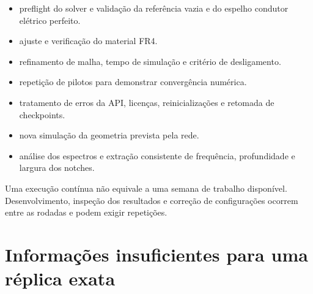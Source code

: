 \documentclass[11pt,a4paper]{article}
\begin{document}
\begin{itemize}
\item preflight do solver e validação da referência vazia e do espelho condutor elétrico perfeito.
\item ajuste e verificação do material FR4.
\item refinamento de malha, tempo de simulação e critério de desligamento.
\item repetição de pilotos para demonstrar convergência numérica.
\item tratamento de erros da API, licenças, reinicializações e retomada de checkpoints.
\item nova simulação da geometria prevista pela rede.
\item análise dos espectros e extração consistente de frequência, profundidade e largura dos notches.
\end{itemize}

Uma execução contínua não equivale a uma semana de trabalho disponível. Desenvolvimento, inspeção dos resultados e correção de configurações ocorrem entre as rodadas e podem exigir repetições.

\section{Informações insuficientes para uma réplica exata}
\end{document}
